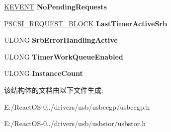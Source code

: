 \begin{DoxyCompactItemize}
\hyperlink{struct___k_e_v_e_n_t}{K\+E\+V\+E\+NT} {\bfseries No\+Pending\+Requests}
\item 
\mbox{\label{struct_f_d_o___d_e_v_i_c_e___e_x_t_e_n_s_i_o_n_a87d5819e5648b139e32bdbc8992e7948}} 
\hyperlink{struct___s_c_s_i___r_e_q_u_e_s_t___b_l_o_c_k}{P\+S\+C\+S\+I\+\_\+\+R\+E\+Q\+U\+E\+S\+T\+\_\+\+B\+L\+O\+CK} {\bfseries Last\+Timer\+Active\+Srb}
\item 
\mbox{\label{struct_f_d_o___d_e_v_i_c_e___e_x_t_e_n_s_i_o_n_aff255d88a2c12f3d524f5f6fec75eadf}} 
U\+L\+O\+NG {\bfseries Srb\+Error\+Handling\+Active}
\item 
\mbox{\label{struct_f_d_o___d_e_v_i_c_e___e_x_t_e_n_s_i_o_n_a0b6e4d4249dfcff22268953f53ee139e}} 
U\+L\+O\+NG {\bfseries Timer\+Work\+Queue\+Enabled}
\item 
\mbox{\label{struct_f_d_o___d_e_v_i_c_e___e_x_t_e_n_s_i_o_n_a9139cc73aab2cdf7c797a19417444cc3}} 
U\+L\+O\+NG {\bfseries Instance\+Count}
\end{DoxyCompactItemize}


该结构体的文档由以下文件生成\+:\begin{DoxyCompactItemize}
\item 
E\+:/\+React\+O\+S-\/0../drivers/usb/usbccgp/usbccgp.\+h\item 
E\+:/\+React\+O\+S-\/0../drivers/usb/usbstor/usbstor.\+h\end{DoxyCompactItemize}
